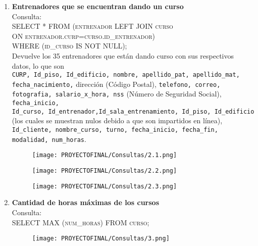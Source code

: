 \documentclass[12pt,letterpaper]{article}
\begin{document}
\begin{enumerate}
\newpage
    \item \textbf{Entrenadores que se encuentran dando un curso} \\
    Consulta:\\ \textsc{SELECT * FROM (entrenador LEFT JOIN curso\\ ON entrenador.curp=curso.id\_entrenador)\\ WHERE (id\_curso IS NOT NULL);} \\Devuelve los 35 entrenadores  que están dando curso con sus respectivos datos, lo que son\\
    \texttt{CURP, Id\_piso, Id\_edificio, nombre, apellido\_pat, apellido\_mat, fecha\_nacimiento,} dirección (Código Postal), \texttt{telefono, correo, fotografia, salario\_x\_hora, nss} (Número de Seguridad Social), \texttt{fecha\_inicio,\\Id\_curso, Id\_entrenador,Id\_sala\_entrenamiento, Id\_piso, Id\_edificio} (los cuales se muestran nulos debido a que son impartidos en línea), \texttt{Id\_cliente, nombre\_curso, turno, fecha\_inicio, fecha\_fin, modalidad, num\_horas}.
    \begin{figure}[h]
        \centering
        \texttt{[image: PROYECTOFINAL/Consultas/2.1.png]}
    \end{figure}
    \begin{figure}[h]
        \centering
        \texttt{[image: PROYECTOFINAL/Consultas/2.2.png]}
    \end{figure}
    \begin{figure}[h]
        \centering
        \texttt{[image: PROYECTOFINAL/Consultas/2.3.png]}
    \end{figure}

\newpage
    \item \textbf{Cantidad de horas máximas de los cursos}\\     
    Consulta:\\
    \textsc{ SELECT MAX (num\_horas) FROM curso;}
    \begin{figure}[h]
        \centering
        \texttt{[image: PROYECTOFINAL/Consultas/3.png]}
    \end{figure}


\end{enumerate}
\end{document}

